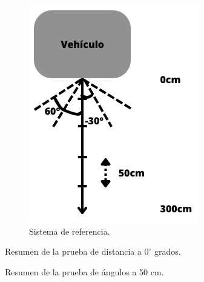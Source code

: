 \begin{figure}[bth]
    \centering
    \includegraphics[width=.3\textwidth]{imgs/sistema-referencia.png}
    \caption{Sistema de referencia.}
    \label{fig:sistema-medicion-angulos}
\end{figure}

\begin{table}
    \centering
    
    \caption{Resumen de la prueba de distancia a $0^\circ$ grados.}
    \label{tab:resumen-distancia}
\end{table}

\begin{table}
    \centering
    
    \caption{Resumen de la prueba de ángulos a 50 cm.}
    \label{tab:resumen-angulo}
\end{table}


